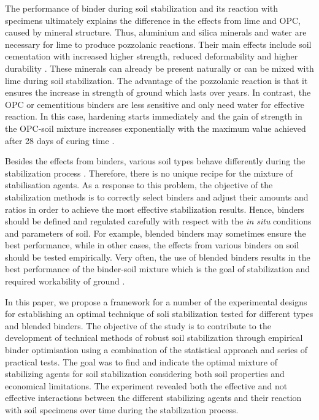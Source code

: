 \documentclass[eprint,
]{actapoly}
\begin{document}
The performance of binder during soil stabilization and its reaction with specimens ultimately explains the difference in the effects from lime and OPC, caused by mineral structure. Thus, aluminium and silica minerals and water are necessary for lime to produce pozzolanic reactions. Their main effects include soil cementation with increased higher strength, reduced deformability and higher durability \citep{DISANTE2022100742,AkulaLittle,1988240,VITALE201736}. These minerals can already be present naturally or can be mixed with lime during soil stabilization. The advantage of the pozzolanic reaction is that it ensures the increase in strength of ground which lasts over years. In contrast, the OPC or cementitious binders are less sensitive and only need water for effective reaction. In this case, hardening starts immediately and the gain of strength in the OPC-soil mixture increases exponentially with the maximum value achieved after 28 days of curing time \citep{Bell1995,Makusa}. 

Besides the effects from binders, various soil types behave differently during the stabilization process \citep{BhattacharjaBhatty,Burroughs2008,Renjithetal2020,VENDAOLIVEIRA2018336,Wall}. Therefore, there is no unique recipe for the mixture of stabilisation agents. As a response to this problem, the objective of the stabilization methods is to correctly select binders and adjust their amounts and ratios in order to achieve the most effective stabilization results. Hence, binders should be defined and regulated carefully with respect with the \emph{in situ} conditions and parameters of soil. For example, blended binders may sometimes ensure the best performance, while in other cases, the effects from various binders on soil should be tested empirically. Very often, the use of blended binders results in the best performance of the binder-soil mixture which is the goal of stabilization and required workability of ground \citep{Schanz,Kangetal2019}. 

In this paper, we propose a framework for a number of the experimental designs for establishing an optimal technique of soli stabilization tested for different types and blended binders. The objective of the study is to contribute to the development of technical methods of robust soil stabilization through empirical binder optimisation using a combination of the statistical approach and series of practical tests. The goal was to find and indicate the optimal mixture of stabilizing agents for soil stabilization considering both soil properties and economical limitations. The experiment revealed both the effective and not effective interactions between the different stabilizing agents and their reaction with soil specimens over time during the stabilization process. 
\end{document}
